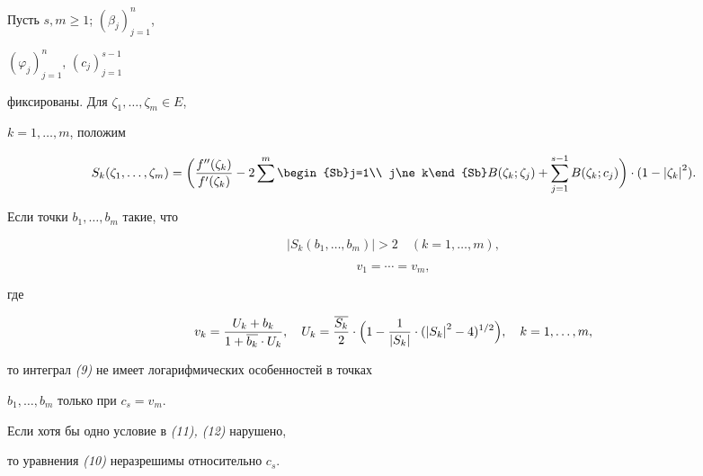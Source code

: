 \begin{thm}


Пусть $s,m\ge 1$; $(\beta _{j})_{j=1}^{n}$,


$(\varphi _{j})_{j=1}^{n}$, $(c_{j})_{j=1}^{s-1}$


фиксированы. Для $\zeta_{1},\dotsc,\zeta_{m}\in E$,


$k=1,\dotsc,m$, положим


$$


S_{k}(\zeta _{1},\dotsc,\zeta_{m})


=\biggl(


\frac{f''(\zeta_{k})}{f'(\zeta _{k})}


-2\sum^m\begin{Sb}j=1\\ j\ne k\end{Sb}


B(\zeta _{k}; \zeta _{j})


+\sum _{j=1}^{s-1}B(\zeta _{k}; c_{j})


\biggr) \cdot (1-{|\zeta _{k}| }^{2}).


$$


Если точки $b_{1},\dotsc,b_{m}$ такие, что


\begin{equation}


|S_{k}( b_{1},\dotsc,b_{m})| >2 \quad


(k=1,\dotsc,m),


\end{equation}




\begin{equation}


v_{1}=\dotsb =v_{m},


\end{equation}






где


$$


v_{k}=\dfrac{U_{k}+b_{k}}{1+\overline{b_{k}}\cdot U_{k}},\quad


U_{k}=\dfrac{\overline{S_{k}}}{2}


\cdot\Bigl(1-\dfrac{1}{|S_{k}|}\cdot({|S_{k}|}^{2}-4)^{1/2}\Bigr),\quad


k=1,\dotsc,m,


$$


то интеграл {\em (9)} не имеет логарифмических особенностей в точках


$b_{1},\dotsc,b_{m}$ только при $c_{s}=v_{m}$.


Если хотя бы одно условие в {\em (11), (12)} нарушено,


то уравнения {\em (10)} неразрешимы относительно $c_{s}$.


\end{thm}





